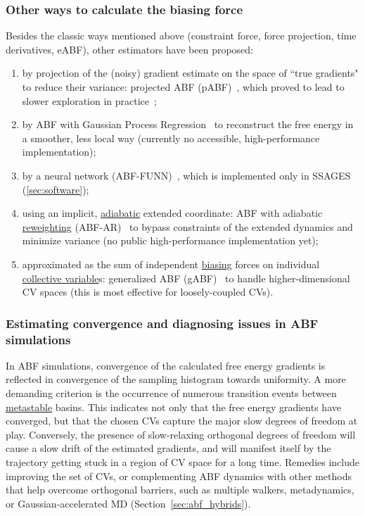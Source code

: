 \documentclass[9pt,review]{livecoms}
\begin{document}
\subsubsection{Other ways to calculate the biasing force}
\label{sec:ABF_variants}

Besides the classic ways mentioned above (constraint force, force projection, time derivatives, eABF), other estimators have been proposed:
\begin{enumerate}
\item by projection of the (noisy) gradient estimate on the space of ``true gradients" to reduce their variance: projected ABF (pABF)~\cite{lelievre-rousset-stoltz-07-a,Alrachid2015}, which proved to lead to slower exploration in practice~\cite{Henin2021integration};
\item by ABF with Gaussian Process Regression~\cite{Mones2016} to reconstruct the free energy in a smoother, less local way (currently no accessible, high-performance implementation);
\item by a neural network (ABF-FUNN)~\cite{Guo2018}, which is implemented only in SSAGES (\ref{sec:software});
\item using an implicit, \hyperlink{ref:AdiabaticDyn} {adiabatic} extended coordinate: ABF with adiabatic \hyperlink{ref:Reweighting} {reweighting} (ABF-AR)~\cite{Cao2014} to bypass constraints of the extended dynamics and minimize variance (no public high-performance implementation yet);
\item approximated as the sum of independent \hyperlink{ref:biasingE} {biasing} forces on individual \hyperlink{ref:CV} {collective variable}s: generalized ABF (gABF)~\cite{Chipot2011, Zhao2017} to handle higher-dimensional CV spaces (this is most effective for loosely-coupled CVs).
\end{enumerate}


\subsubsection{Estimating convergence and diagnosing issues in ABF simulations}

In ABF simulations, convergence of the calculated free energy gradients is reflected in convergence of the sampling histogram towards uniformity.
A more demanding criterion is the occurrence of numerous transition events between \hyperlink{ref:metastab} {metastable} basins.
This indicates not only that the free energy gradients have converged, but that the chosen CVs capture the major slow degrees of freedom at play.
Conversely, the presence of slow-relaxing orthogonal degrees of freedom will cause a slow drift of the estimated gradients, and will manifest itself by the trajectory getting stuck in a region of CV space for a long time.
Remedies include improving the set of CVs, or complementing ABF dynamics with other methods that help overcome orthogonal barriers, such as multiple walkers, metadynamics, or Gaussian-accelerated MD (Section~\ref{sec:abf_hybrids}).
\end{document}
